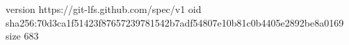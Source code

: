 version https://git-lfs.github.com/spec/v1
oid sha256:70d3ca1f51423f87657239781542b7adf54807e10b81c0b4405e2892be8a0169
size 683
